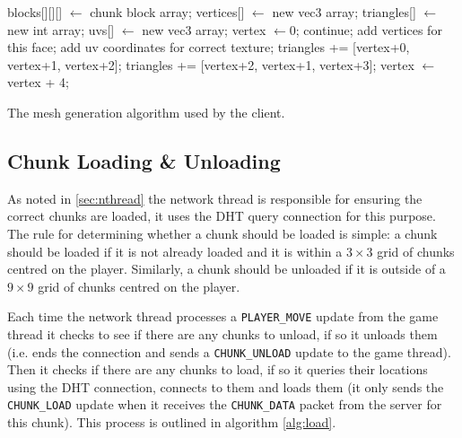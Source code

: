 \documentclass[10pt,twoside,notitlepage,a4paper]{report}
\begin{document}
	\begin{algorithm}
		\begin{algorithmic}
			\State blocks[][][] $\gets$ chunk block array;
			\State vertices[] $\gets$ new vec3 array;
			\State triangles[] $\gets$ new int array;
			\State uvs[] $\gets$ new vec3 array;
			\State vertex $\gets 0$;
								\State continue;
							\EndIf
							\State add vertices for this face;
							\State add uv coordinates for correct texture;
							\State triangles += [vertex+0, vertex+1, vertex+2];
							\State triangles += [vertex+2, vertex+1, vertex+3];
							\State vertex $\gets$ vertex + 4;
						\EndFor
					\EndFor
				\EndFor
			\EndFor
		\end{algorithmic}
		\caption{The mesh generation algorithm used by the client.}
		\label{alg:mesh}
	\end{algorithm}
	
	\subsection{Chunk Loading \& Unloading}
	\label{sec:loading}
	As noted in \cref{sec:nthread} the network thread is responsible for ensuring the correct chunks are loaded, it uses the DHT query connection for this purpose. The rule for determining whether a chunk should be loaded is simple: a chunk should be loaded if it is not already loaded and it is within a $3\times3$ grid of chunks centred on the player. Similarly, a chunk should be unloaded if it is outside of a $9\times9$ grid of chunks centred on the player.
	
	Each time the network thread processes a \texttt{PLAYER\_MOVE} update from the game thread it checks to see if there are any chunks to unload, if so it unloads them (i.e. ends the connection and sends a \texttt{CHUNK\_UNLOAD} update to the game thread). Then it checks if there are any chunks to load, if so it queries their locations using the DHT connection, connects to them and loads them (it only sends the \texttt{CHUNK\_LOAD} update when it receives the \texttt{CHUNK\_DATA} packet from the server for this chunk). This process is outlined in algorithm \ref{alg:load}.
	
\end{document}
